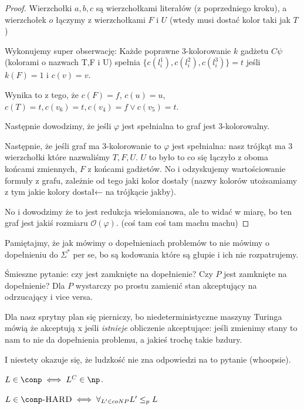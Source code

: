 \begin{proof}
	Wierzchołki \( a , b, c \) są wierzchołkami literałów (z poprzedniego kroku), a wierzchołek \( o \) łączymy z wierzchołkami \( F \) i \( U \) (wtedy musi dostać kolor taki jak \( T \))

	Wykonujemy super obserwację: Każde poprawne 3-kolorowanie $k$ gadżetu \(C\psi\) (kolorami o nazwach T,F i U) spełnia \(\{c(l_i^1), c(l_i^2), c(l_i^3)\} = t\) jeśli \(k(F) = 1\) i \(c(v) = v\).

	Wynika to z tego, że \(c(F) = f\), \(c(u) = u\), \(c(T) = t, c(v_6) = t, c(v_4) = f \lor c(v_5) = t \).

	Następnie dowodzimy, że jeśli \( \varphi\) jest spełnialna to graf jest 3-kolorowalny.

	Następnie, że jeśli graf ma 3-kolorowanie to \( \varphi \) jest spełnialna: nasz trójkąt ma 3 wierzchołki które nazwaliśmy \(T, F, U\). \(U\) to było to co się łączyło z oboma końcami zmiennych, \(F\) z końcami gadżetów. No i odzyskujemy wartościowanie formuły z grafu, zależnie od tego jaki kolor dostały (nazwy kolorów utożsamiamy z tym jakie kolory dostał← na trójkącie jakby).

	No i dowodzimy że to jest redukcja wielomianowa, ale to widać w miarę, bo ten graf jest jakiś rozmiaru \(\mathcal{O}(\varphi)\). (coś tam coś tam machu machu)

\end{proof}

Pamiętajmy, że jak mówimy o dopełnieniach problemów to nie mówimy o dopełnieniu do \( \Sigma^* \) per se, bo są kodowania które są głupie i ich nie rozpatrujemy.

Śmieszne pytanie: czy \np jest zamknięte na dopełnienie? Czy \(P\) jest zamknięte na dopełnienie? Dla \(P\) wystarczy po prostu zamienić stan akceptujący na odrzucający i vice versa.

Dla \np nasz sprytny plan się pierniczy, bo niedeterministyczne maszyny Turinga mówią że akceptują x jeśli \textit{istnieje} obliczenie akceptujące: jeśli zmienimy stany to nam to nie da dopełnienia problemu, a jakieś trochę takie bzdury.

I niestety okazuje się, że ludzkość nie zna odpowiedzi na to pytanie (whoopsie).

\begin{definition}
	\(  L \in  \conp \iff L^C  \in \np \).
\end{definition}

\begin{definition}
	\( L \in \conp \textsc{-HARD} \iff \forall_{L' \in coNP} L' \leq_p L  \)
\end{definition}

